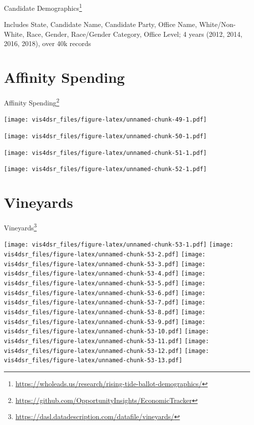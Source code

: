 \documentclass[
]{krantz}
\renewcommand{\href}[2]{#2\footnote{\url{#1}}}
\begin{document}
\href{https://wholeads.us/research/rising-tide-ballot-demographics/}{Candidate Demographics}

Includes State, Candidate Name, Candidate Party, Office Name, White/Non-White, Race, Gender, Race/Gender Category, Office Level; 4 years (2012, 2014, 2016, 2018), over 40k records

\hypertarget{affinity-spending}{%
\section*{Affinity Spending}\label{affinity-spending}}


\href{https://github.com/OpportunityInsights/EconomicTracker}{Affinity Spending}

\texttt{[image: vis4dsr\_files/figure-latex/unnamed-chunk-49-1.pdf]}

\texttt{[image: vis4dsr\_files/figure-latex/unnamed-chunk-50-1.pdf]}

\texttt{[image: vis4dsr\_files/figure-latex/unnamed-chunk-51-1.pdf]}

\texttt{[image: vis4dsr\_files/figure-latex/unnamed-chunk-52-1.pdf]}

\hypertarget{vineyards}{%
\section*{Vineyards}\label{vineyards}}


\href{https://dasl.datadescription.com/datafile/vineyards/}{Vineyards}

\texttt{[image: vis4dsr\_files/figure-latex/unnamed-chunk-53-1.pdf]} \texttt{[image: vis4dsr\_files/figure-latex/unnamed-chunk-53-2.pdf]} \texttt{[image: vis4dsr\_files/figure-latex/unnamed-chunk-53-3.pdf]} \texttt{[image: vis4dsr\_files/figure-latex/unnamed-chunk-53-4.pdf]} \texttt{[image: vis4dsr\_files/figure-latex/unnamed-chunk-53-5.pdf]} \texttt{[image: vis4dsr\_files/figure-latex/unnamed-chunk-53-6.pdf]} \texttt{[image: vis4dsr\_files/figure-latex/unnamed-chunk-53-7.pdf]} \texttt{[image: vis4dsr\_files/figure-latex/unnamed-chunk-53-8.pdf]} \texttt{[image: vis4dsr\_files/figure-latex/unnamed-chunk-53-9.pdf]} \texttt{[image: vis4dsr\_files/figure-latex/unnamed-chunk-53-10.pdf]} \texttt{[image: vis4dsr\_files/figure-latex/unnamed-chunk-53-11.pdf]} \texttt{[image: vis4dsr\_files/figure-latex/unnamed-chunk-53-12.pdf]} \texttt{[image: vis4dsr\_files/figure-latex/unnamed-chunk-53-13.pdf]}

  

\backmatter
\printindex
\end{document}
